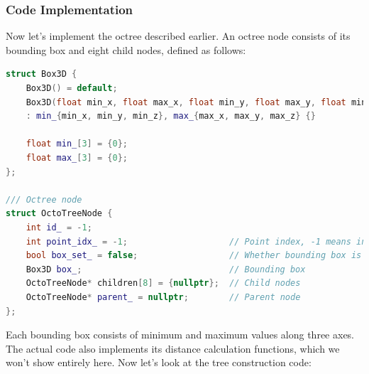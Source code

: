 \subsubsection{Code Implementation}  
Now let's implement the octree described earlier. An octree node consists of its bounding box and eight child nodes, defined as follows:

\begin{lstlisting}[language=c++,caption=src/ch5/octo\_tree.h]
struct Box3D {
	Box3D() = default;
	Box3D(float min_x, float max_x, float min_y, float max_y, float min_z, float max_z)
	: min_{min_x, min_y, min_z}, max_{max_x, max_y, max_z} {}
	
	float min_[3] = {0};
	float max_[3] = {0};
};

/// Octree node
struct OctoTreeNode {
	int id_ = -1;
	int point_idx_ = -1;                    // Point index, -1 means invalid
	bool box_set_ = false;                  // Whether bounding box is set
	Box3D box_;                             // Bounding box
	OctoTreeNode* children[8] = {nullptr};  // Child nodes
	OctoTreeNode* parent_ = nullptr;        // Parent node
};
\end{lstlisting}

Each bounding box consists of minimum and maximum values along three axes. The actual code also implements its distance calculation functions, which we won't show entirely here. Now let's look at the tree construction code:

